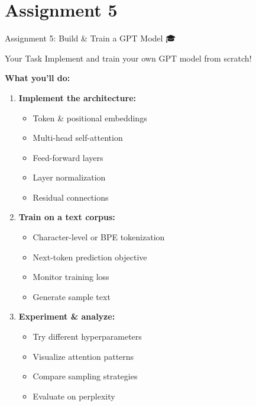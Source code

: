 \documentclass[aspectratio=169]{beamer}
\begin{document}
\section{Assignment 5}

\begin{frame}{Assignment 5: Build \& Train a GPT Model 🎓}
\begin{alertblock}{Your Task}
Implement and train your own GPT model from scratch!
\end{alertblock}

\vspace{0.5em}

\textbf{What you'll do:}
\begin{enumerate}
    \item \textbf{Implement the architecture:}
    \begin{itemize}
        \item Token \& positional embeddings
        \item Multi-head self-attention
        \item Feed-forward layers
        \item Layer normalization
        \item Residual connections
    \end{itemize}

    \item \textbf{Train on a text corpus:}
    \begin{itemize}
        \item Character-level or BPE tokenization
        \item Next-token prediction objective
        \item Monitor training loss
        \item Generate sample text
    \end{itemize}

    \item \textbf{Experiment \& analyze:}
    \begin{itemize}
        \item Try different hyperparameters
        \item Visualize attention patterns
        \item Compare sampling strategies
        \item Evaluate on perplexity
    \end{itemize}
\end{enumerate}
\end{frame}
\end{document}
